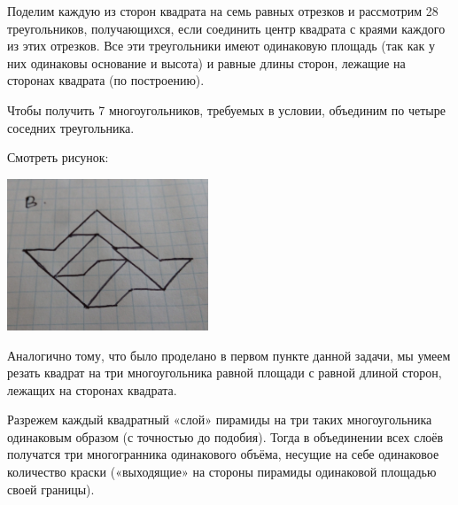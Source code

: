 \begin{itemize}
\itA Поделим каждую из сторон квадрата на семь равных отрезков и рассмотрим 28 треугольников, получающихся, если соединить центр квадрата с краями каждого из этих отрезков. Все эти треугольники имеют одинаковую площадь (так как у них одинаковы основание и высота) и равные длины сторон, лежащие на сторонах квадрата (по построению).

Чтобы получить 7 многоугольников, требуемых в условии, объединим по четыре соседних треугольника.

\itB Смотреть рисунок:

\begin{center}
	\includegraphics[natwidth=3081,natheight=2328,width=6cm]{figures/2018-figure-cuts}
\end{center}

\itC Аналогично тому, что было проделано в первом пункте данной задачи, мы умеем резать квадрат на три многоугольника равной площади с равной длиной сторон, лежащих на сторонах квадрата.

Разрежем каждый квадратный «слой» пирамиды на три таких многоугольника одинаковым образом (с точностью до подобия). Тогда в объединении всех слоёв получатся три многогранника одинакового объёма, несущие на себе одинаковое количество краски («выходящие» на стороны пирамиды одинаковой площадью своей границы).
\end{itemize}